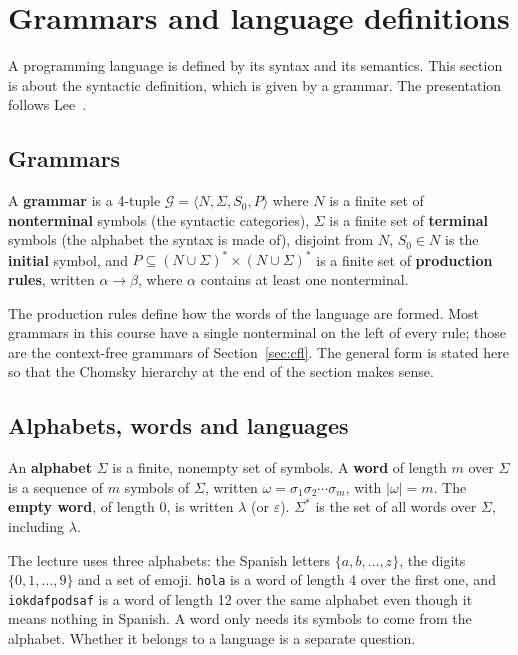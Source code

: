\section{Grammars and language definitions}
\label{sec:grammars}

A programming language is defined by its syntax and its semantics. This
section is about the syntactic definition, which is given by a grammar. The
presentation follows Lee~\cite[Ch.~2]{lee2017foundations}.

\subsection{Grammars}

\begin{definition}
A \textbf{grammar} is a 4-tuple $\mathcal{G} = \langle N, \Sigma, S_0, P \rangle$ where
$N$ is a finite set of \textbf{nonterminal} symbols (the syntactic categories),
$\Sigma$ is a finite set of \textbf{terminal} symbols (the alphabet the syntax is
made of), disjoint from $N$, $S_0 \in N$ is the \textbf{initial} symbol, and
$P \subseteq (N \cup \Sigma)^* \times (N \cup \Sigma)^*$ is a finite set of
\textbf{production rules}, written $\alpha \to \beta$, where $\alpha$ contains
at least one nonterminal.
\end{definition}

The production rules define how the words of the language are formed. Most
grammars in this course have a single nonterminal on the left of every rule;
those are the context-free grammars of Section~\ref{sec:cfl}. The general form
is stated here so that the Chomsky hierarchy at the end of the section makes
sense.

\subsection{Alphabets, words and languages}

\begin{definition}
An \textbf{alphabet} $\Sigma$ is a finite, nonempty set of symbols. A
\textbf{word} of length $m$ over $\Sigma$ is a sequence of $m$ symbols of
$\Sigma$, written $\omega = \sigma_1 \sigma_2 \cdots \sigma_m$, with
$|\omega| = m$. The \textbf{empty word}, of length 0, is written $\lambda$ (or
$\varepsilon$). $\Sigma^*$ is the set of all words over $\Sigma$, including
$\lambda$.
\end{definition}

The lecture uses three alphabets: the Spanish letters $\{a, b, \dots, z\}$, the
digits $\{0, 1, \dots, 9\}$ and a set of emoji. \texttt{hola} is a word of
length 4 over the first one, and \texttt{iokdafpodsaf} is a word of length 12
over the same alphabet even though it means nothing in Spanish. A word only
needs its symbols to come from the alphabet. Whether it belongs to a language
is a separate question.

